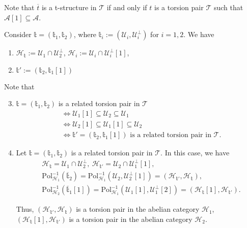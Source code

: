 Note that $\overline{t}$ is a t-structure in $\mathcal{T}$ if and only if $t$ is a torsion
pair $\mathcal{T}$ such that $\mathcal{A}[1]\subseteq\mathcal{A}$.

\begin{rmk}
  Consider $\mathbb{t}=(\mathbb{t}_1,\mathbb{t}_2)$, where $\mathbb{t}_i:=(\mathcal{U}_i,\mathcal{U}_i^\perp)$ for
  $i=1,2$. We have
  \begin{enumerate}
    \item $\mathcal{H}_\mathbb{t}:=\mathcal{U}_1\cap\mathcal{U}_2^\perp$,
      $\mathcal{H}_i:=\mathcal{U}_i\cap\mathcal{U}_i^\perp[1]$,
    \item $\mathbb{t}' :=(\mathbb{t}_2,\mathbb{t}_1[1])$
  \end{enumerate}

  Note that
  \begin{enumerate}
    \setcounter{enumi}{2}
    \item $\mathbb{t}=(\mathbb{t}_1,\mathbb{t}_2)$ is a related torsion pair in $\mathcal{T}$
      \begin{align*}
        &\Leftrightarrow \mathcal{U}_1[1]\subseteq\mathcal{U}_2\subseteq\mathcal{U}_1\\
        &\Leftrightarrow \mathcal{U}_2[1]\subseteq\mathcal{U}_1[1]\subseteq\mathcal{U}_2\\
        &\Leftrightarrow \mathbb{t}'=(\mathbb{t}_2,\mathbb{t}_1[1]) \text{ is a related torsion pair in }\mathcal{T}.
      \end{align*}
    \item Let $\mathbb{t}=(\mathbb{t}_1,\mathbb{t}_2)$ is a related torsion pair in $\mathcal{T}$. In
      this case, we have
      \begin{align*}
        &\mathcal{H}_\mathbb{t} = \mathcal{U}_1\cap\mathcal{U}_2^\perp,~
        \mathcal{H}_{\mathbb{t}'}=\mathcal{U}_2\cap \mathcal{U}_1^\perp[1],\\
        & \mathrm{Pol}_{\mathcal{H}_1}^{-1}(\overline{\mathbb{t}}_2)=
        \mathrm{Pol}_{\mathcal{H}_1}^{-1}(\mathcal{U}_2,\mathcal{U}_2^\perp[1])=
        (\mathcal{H}_{\mathbb{t}'},\mathcal{H}_{\mathbb{t}}),\\
        &\mathrm{Pol}_{\mathcal{H}_2}^{-1}(\overline{\mathbb{t}}_1[1])=
        \mathrm{Pol}_{\mathcal{H}_1}^{-1}(\mathcal{U}_1[1],\mathcal{U}_1^\perp[2])=
        (\mathcal{H}_{\mathbb{t}}[1],\mathcal{H}_{\mathbb{t}'}).
      \end{align*}

      Thus, $(\mathcal{H}_{\mathbb{t}'},\mathcal{H}_\mathbb{t})$ is a torsion pair in the abelian
      category $\mathcal{H}_1$,
      $(\mathcal{H}_\mathbb{t}[1],\mathcal{H}_{\mathbb{t}'})$ is a torsion pair in the abelian category
      $\mathcal{H}_2$.
  \end{enumerate}
\end{rmk}

